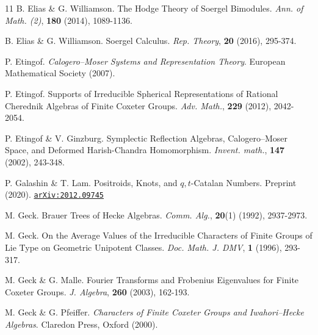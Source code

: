 \documentclass[a4paper,10pt,leqno]{amsart}
\theoremstyle{plain}
\theoremstyle{plain}
\theoremstyle{plain}
\theoremstyle{definition}
\theoremstyle{remark}
\begin{document}
\begin{thebibliography}{11}
	B. Elias \& G. Williamson.
	The Hodge Theory of Soergel Bimodules.
	\textsl{Ann. of Math. (2)},
	\textbf{180}
	(2014),
	1089-1136.

	B. Elias \& G. Williamson.
	Soergel Calculus.
	\textsl{Rep. Theory},
	\textbf{20}
	(2016),
	295-374.
	
	
	P. Etingof.
	\textsl{Calogero--Moser Systems and Representation Theory}.
	European Mathematical Society
	(2007).
	
	P. Etingof.
	Supports of Irreducible Spherical Representations of Rational Cherednik Algebras of Finite Coxeter Groups.
	\textsl{Adv. Math.},
	\textbf{229}
	(2012),
	2042-2054.
	
	P. Etingof \& V. Ginzburg.
	Symplectic Reflection Algebras, Calogero--Moser Space, and Deformed Harish-Chandra Homomorphism.
	\textsl{Invent. math.},
	\textbf{147}
	(2002),
	243-348.
	

	P. Galashin \& T. Lam.
	Positroids, Knots, and $q, t$-Catalan Numbers.
	Preprint (2020).
	\href{https://arxiv.org/abs/2012.09745}{\texttt{arXiv:2012.09745}}

	M. Geck.
	Brauer Trees of Hecke Algebras.
	\textsl{Comm. Alg.},
	\textbf{20}(1)
	(1992),
	2937-2973.
	
	M. Geck.
	On the Average Values of the Irreducible Characters of Finite Groups of Lie Type on Geometric Unipotent Classes.
	\textsl{Doc. Math. J. DMV},
	\textbf{1}
	(1996),
	293-317.
	
	M. Geck \& G. Malle.
	Fourier Transforms and Frobenius Eigenvalues for Finite Coxeter Groups.
	\textsl{J. Algebra},
	\textbf{260}
	(2003),
	162-193.
	
	M. Geck \& G. Pfeiffer.
	\textsl{Characters of Finite Coxeter Groups and Iwahori--Hecke Algebras}.
	Claredon Press, Oxford
	(2000).
	
	

\end{thebibliography}
\end{document}
